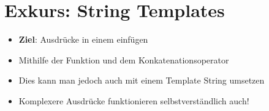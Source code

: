 

\section{Exkurs: String Templates}
\begin{frame}
    \slidehead

    \begin{itemize}[<+->]
        \item \textbf{Ziel}: Ausdrücke in einem  einfügen
        \item Mithilfe der Funktion  und dem Konkatenationsoperator \pythoninline{+}
        \item Dies kann man jedoch auch mit einem Template String umsetzen
    \end{itemize}
\end{frame}

\begin{frame}
    \slidehead

    \begin{itemize}[<+->]
        \item Komplexere Ausdrücke funktionieren selbstverständlich auch!
    \end{itemize}
\end{frame}

